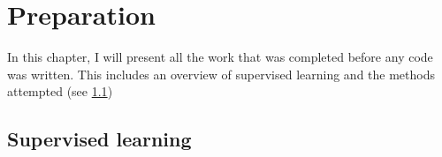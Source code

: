 
	\chapter{Preparation}
	In this chapter, I will present all the work that was completed before any code was written. This includes an overview of supervised learning and the methods attempted (see \ref{2.1})
	\section{Supervised learning} \label{2.1}
